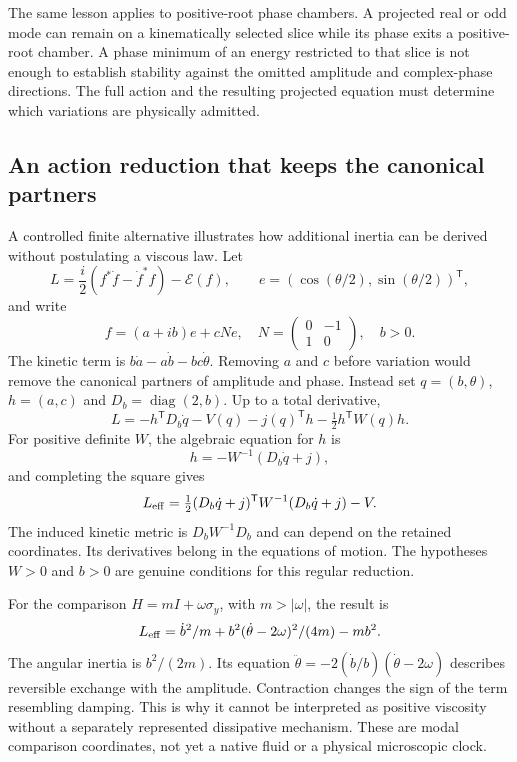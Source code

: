 The same lesson applies to positive-root phase chambers. A projected
real or odd mode can remain on a kinematically selected slice while
its phase exits a positive-root chamber. A phase minimum of an energy
restricted to that slice is not enough to establish stability against
the omitted amplitude and complex-phase directions. The full action
and the resulting projected equation must determine which variations
are physically admitted.

\subsection{An action reduction that keeps the canonical partners}
A controlled finite alternative illustrates how additional inertia
can be derived without postulating a viscous law. Let
\begin{equation}
 L=\frac i2(f^*\dot f-\dot f^*f)-\mathcal E(f),\qquad
 e=(\cos(\theta/2),\sin(\theta/2))^{\mathsf T},
\end{equation}
and write
\begin{equation}
 f=(a+ib)e+cNe,\quad
 N=\begin{pmatrix}0&-1\\1&0\end{pmatrix},\quad b>0.
\end{equation}
The kinetic term is
$b\dot a-a\dot b-bc\dot\theta$. Removing $a$ and $c$ before
variation would remove the canonical partners of amplitude and
phase. Instead set $q=(b,\theta)$, $h=(a,c)$ and
$D_b=\operatorname{diag}(2,b)$. Up to a total derivative,
\begin{equation}
 L=-h^{\mathsf T}D_b\dot q-
       V(q)-j(q)^{\mathsf T}h-\tfrac12h^{\mathsf T}W(q)h.
\end{equation}
For positive definite $W$, the algebraic equation for $h$ is
\begin{equation}
 h=-W^{-1}(D_b\dot q+j),
\end{equation}
and completing the square gives
\begin{equation}
 L_{\rm eff}=\tfrac12(D_b\dot q+j)^{\mathsf T}
                    W^{-1}(D_b\dot q+j)-V.
\end{equation}
The induced kinetic metric is $D_bW^{-1}D_b$ and can depend on
the retained coordinates. Its derivatives belong in the equations
of motion. The hypotheses $W>0$ and $b>0$ are genuine conditions
for this regular reduction.

For the comparison $H=mI+\omega\sigma_y$, with $m>|\omega|$,
the result is
\begin{equation}
 L_{\rm eff}=\dot b^2/m+
       b^2(\dot\theta-2\omega)^2/(4m)-mb^2.
\end{equation}
The angular inertia is $b^2/(2m)$. Its equation
$\ddot\theta=-2(\dot b/b)(\dot\theta-2\omega)$ describes
reversible exchange with the amplitude. Contraction changes the sign
of the term resembling damping. This is why it cannot be interpreted
as positive viscosity without a separately represented dissipative
mechanism. These are modal comparison coordinates, not yet a native
fluid or a physical microscopic clock.

